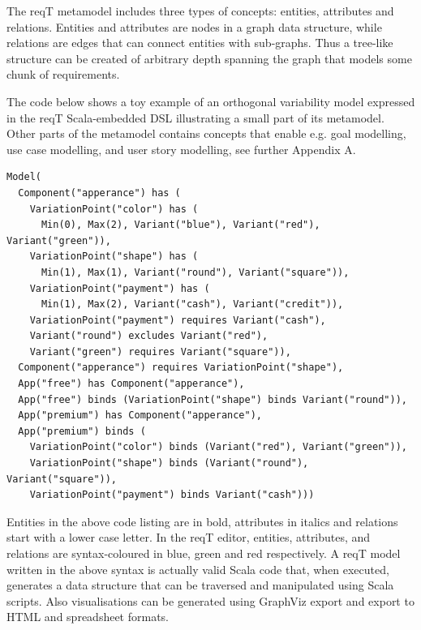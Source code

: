 \documentclass[runningheads,a4paper]{llncs}
\begin{document}
The reqT metamodel includes three types of concepts: entities, attributes and relations. Entities and attributes are nodes in a graph data structure, while relations are edges that can connect entities with sub-graphs. Thus a tree-like structure can be created of arbitrary depth spanning the graph that models some chunk of requirements. 

The code below shows a toy example of an orthogonal variability model \cite{metzger2007variability} expressed in the reqT Scala-embedded DSL \cite{Regnell2013} illustrating a small part of its metamodel. Other parts of the metamodel contains concepts that enable e.g. goal modelling, %
use case modelling, and user story modelling, see further Appendix A.

\begin{spacing}{1.1}
\begin{lstlisting}
Model(
  Component("apperance") has (
    VariationPoint("color") has (
      Min(0), Max(2), Variant("blue"), Variant("red"), Variant("green")),
    VariationPoint("shape") has (
      Min(1), Max(1), Variant("round"), Variant("square")),
    VariationPoint("payment") has (
      Min(1), Max(2), Variant("cash"), Variant("credit")),
    VariationPoint("payment") requires Variant("cash"), 
    Variant("round") excludes Variant("red"),
    Variant("green") requires Variant("square")),
  Component("apperance") requires VariationPoint("shape"), 
  App("free") has Component("apperance"),  
  App("free") binds (VariationPoint("shape") binds Variant("round")),
  App("premium") has Component("apperance"),  
  App("premium") binds ( 
    VariationPoint("color") binds (Variant("red"), Variant("green")),
    VariationPoint("shape") binds (Variant("round"), Variant("square")),
    VariationPoint("payment") binds Variant("cash")))
\end{lstlisting}
\end{spacing}
\noindent Entities in the above code listing are in bold, attributes in italics and relations start with a lower case letter. In the reqT editor, entities, attributes, and relations are syntax-coloured in blue, green and red respectively. A reqT model written in the above syntax is actually valid Scala code that, when executed, generates a data structure that can be traversed and manipulated using Scala scripts. Also visualisations can be generated using GraphViz export and export to HTML and spreadsheet formats. 
\end{document}
